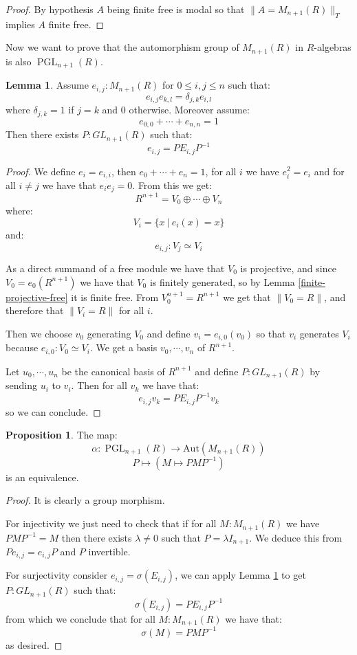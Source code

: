 \documentclass[10pt,a4paper]{article}
\theoremstyle{definition}
\newtheorem{lemma}[theorem]{Lemma}
\newtheorem{proposition}[theorem]{Proposition}
\DeclareMathOperator{\PGL}{PGL}
\newcommand{\propTrunc}[1]{\lVert #1 \rVert}
\newcommand{\Aut}{\mathrm{Aut}}
\begin{document}
\begin{proof}
By hypothesis $A$ being finite free is modal so that $\propTrunc{A=M_{n+1}(R)}_T$ implies $A$ finite free.
\end{proof}

Now we want to prove that the automorphism group of $M_{n+1}(R)$ in $R$-algebras is also $\PGL_{n+1}(R)$.

\begin{lemma}\label{fundamental-system-matrices}
Assume $e_{i,j}:M_{n+1}(R)$ for $0\leq i,j\leq n$ such that:
\[e_{i,j}e_{k,l} = \delta_{j,k}e_{i,l}\]
where $\delta_{j,k} = 1$ if $j=k$ and $0$ otherwise. Moreover assume:
\[e_{0,0}+\cdots+e_{n,n}=1\]
Then there exists $P:GL_{n+1}(R)$ such that:
\[e_{i,j} = PE_{i,j}P^{-1}\]
\end{lemma}

\begin{proof}
We define $e_i = e_{i,i}$, then $e_0+\cdots+e_n = 1$, for all $i$ we have $e_i^2=e_i$ and for all $i\not=j$ we have that $e_ie_j=0$. From this we get:
\[R^{n+1} = V_0\oplus\cdots\oplus V_n\]
where:
\[V_i = \{x\ |\ e_i(x)=x\}\]
and:
\[e_{i,j}:V_j\simeq V_i\]

As a direct summand of a free module we have that $V_0$ is projective, and since $V_0 = e_{0}(R^{n+1})$ we have that $V_0$ is finitely generated, so by Lemma \ref{finite-projective-free} it is finite free. From $V_0^{n+1}=R^{n+1}$ we get that $\propTrunc{V_0=R}$, and therefore that $\propTrunc{V_i=R}$ for all $i$.

Then we choose $v_0$ generating $V_0$ and define $v_i = e_{i,0}(v_0)$ so that $v_i$ generates $V_i$ because $e_{i,0}:V_0\simeq V_i$. We get a basis $v_0,\cdots,v_n$ of $R^{n+1}$.

Let $u_0,\cdots,u_n$ be the canonical basis of $R^{n+1}$ and define $P:GL_{n+1}(R)$ by sending $u_i$ to $v_i$. Then for all $v_k$ we have that:
\[e_{i,j}v_k = PE_{i,j}P^{-1}v_k\]
so we can conclude.
\end{proof}

\begin{proposition}\label{Aut-MnR-PGL}
The map:
\[\alpha:\PGL_{n+1}(R)\to\Aut(M_{n+1}(R))\]
\[P\mapsto (M\mapsto PMP^{-1})\]
is an equivalence.
\end{proposition}

\begin{proof}
It is clearly a group morphism. 

For injectivity we just need to check that if for all $M:M_{n+1}(R)$ we have $PMP^{-1}=M$ then there exists $\lambda\not=0$ such that $P=\lambda I_{n+1}$. We deduce this from $Pe_{i,j} = e_{i,j}P$ and $P$ invertible.

For surjectivity consider $e_{i,j}=\sigma(E_{i,j})$, we can apply Lemma \ref{fundamental-system-matrices} to get $P:GL_{n+1}(R)$ such that:
\[\sigma(E_{i,j}) = PE_{i,j}P^{-1}\]
from which we conclude that for all $M:M_{n+1}(R)$ we have that:
\[\sigma(M) = PMP^{-1}\]
as desired.
\end{proof}
\end{document}
